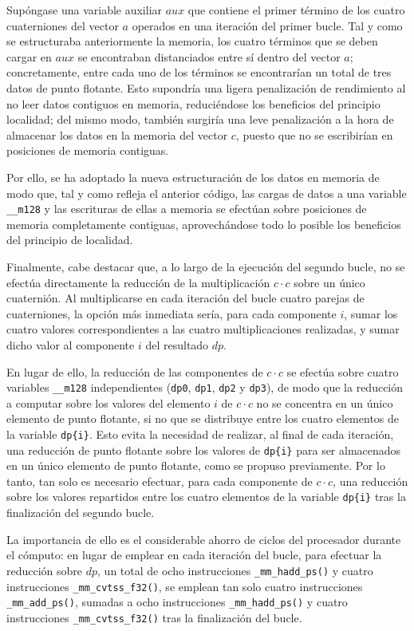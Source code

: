 \documentclass[conference]{IEEEtran}
\begin{document}
Supóngase una variable auxiliar $aux$ que contiene el primer término de los cuatro cuaterniones del vector $a$ operados en una iteración del primer bucle. Tal y como se estructuraba anteriormente la memoria, los cuatro términos que se deben cargar en $aux$ se encontraban distanciados entre sí dentro del vector $a$; concretamente, entre cada uno de los términos se encontrarían un total de tres datos de punto flotante. Esto supondría una ligera penalización de rendimiento al no leer datos contiguos en memoria, reduciéndose los beneficios del principio localidad; del mismo modo, también surgiría una leve penalización a la hora de almacenar los datos en la memoria del vector $c$, puesto que no se escribirían en posiciones de memoria contiguas.

Por ello, se ha adoptado la nueva estructuración de los datos en memoria de modo que, tal y como refleja el anterior código, las cargas de datos a una variable \texttt{\_\_m128} y las escrituras de ellas a memoria se efectúan sobre posiciones de memoria completamente contiguas, aprovechándose todo lo posible los beneficios del principio de localidad.

Finalmente, cabe destacar que, a lo largo de la ejecución del segundo bucle, no se efectúa directamente la reducción de la multiplicación $c \cdot c$ sobre un único cuaternión. Al multiplicarse en cada iteración del bucle cuatro parejas de cuaterniones, la opción más inmediata sería, para cada componente $i$, sumar los cuatro valores correspondientes a las cuatro multiplicaciones realizadas, y sumar dicho valor al componente $i$ del resultado $dp$.

En lugar de ello, la reducción de las componentes de $c \cdot c$ se efectúa sobre cuatro variables \texttt{\_\_m128} independientes (\texttt{dp0}, \texttt{dp1}, \texttt{dp2} y \texttt{dp3}), de modo que la reducción a computar sobre los valores del elemento $i$ de $c \cdot c$ no se concentra en un único elemento de punto flotante, si no que se distribuye entre los cuatro elementos de la variable \texttt{dp\{i\}}. Esto evita la necesidad de realizar, al final de cada iteración, una reducción de punto flotante sobre los valores de \texttt{dp\{i\}} para ser almacenados en un único elemento de punto flotante, como se propuso previamente. Por lo tanto, tan solo es necesario efectuar, para cada componente de $c \cdot c$, una reducción sobre los valores repartidos entre los cuatro elementos de la variable \texttt{dp\{i\}} tras la finalización del segundo bucle.

La importancia de ello es el considerable ahorro de ciclos del procesador durante el cómputo: en lugar de emplear en cada iteración del bucle, para efectuar la reducción sobre $dp$, un total de ocho instrucciones \texttt{\_mm\_hadd\_ps()} y cuatro instrucciones \texttt{\_mm\_cvtss\_f32()}, se emplean tan solo cuatro instrucciones \texttt{\_mm\_add\_ps()}, sumadas a ocho instrucciones \texttt{\_mm\_hadd\_ps()} y cuatro instrucciones \texttt{\_mm\_cvtss\_f32()} tras la finalización del bucle.
\end{document}
